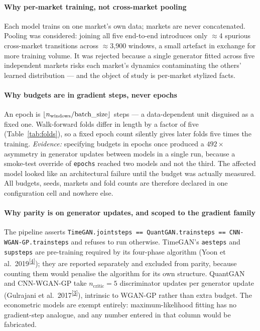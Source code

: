 \documentclass[11pt,a4paper]{article}
\makeatletter
\newcommand{\tcite}[1]{\textsuperscript{[\hyperlink{R:#1}{#1}]}}
\DeclareRobustCommand{\_}{\ifmmode\nfss@text{\textunderscore}\else\textunderscore\allowbreak\fi}
\makeatother
\begin{document}
\paragraph{Why per-market training, not cross-market pooling} Each model trains on one market's own data; markets are never concatenated. Pooling was considered: joining all five end-to-end introduces only $\approx$4 spurious cross-market transitions across $\approx$3{,}900 windows, a small artefact in exchange for more training volume. It was rejected because a single generator fitted across five independent markets risks each market's dynamics contaminating the others' learned distribution --- and the object of study is per-market stylized facts.

\paragraph{Why budgets are in gradient steps, never epochs} An epoch is $\lfloor n_\text{windows}/\text{batch\_size}\rfloor$ steps --- a data-dependent unit disguised as a fixed one. Walk-forward folds differ in length by a factor of five (Table~\ref{tab:folds}), so a fixed epoch count silently gives later folds five times the training. \textit{Evidence:} specifying budgets in epochs once produced a $492\times$ asymmetry in generator updates between models in a single run, because a smoke-test override of \texttt{epochs} reached two models and not the third. The affected model looked like an architectural failure until the budget was actually measured. All budgets, seeds, markets and fold counts are therefore declared in one configuration cell and nowhere else.

\paragraph{Why parity is on generator updates, and scoped to the gradient family} The pipeline asserts \texttt{TimeGAN.joint\_steps == QuantGAN.train\_steps == CNN-WGAN-GP.train\_steps} and refuses to run otherwise. TimeGAN's \texttt{ae\_steps} and \texttt{sup\_steps} are pre-training required by its four-phase algorithm (Yoon et al.\ 2019\tcite{4}); they are reported separately and excluded from parity, because counting them would penalise the algorithm for its own structure. QuantGAN and CNN-WGAN-GP take $n_\text{critic}=5$ discriminator updates per generator update (Gulrajani et al.\ 2017\tcite{3}), intrinsic to WGAN-GP rather than extra budget. The econometric models are exempt entirely: maximum-likelihood fitting has no gradient-step analogue, and any number entered in that column would be fabricated.
\end{document}
